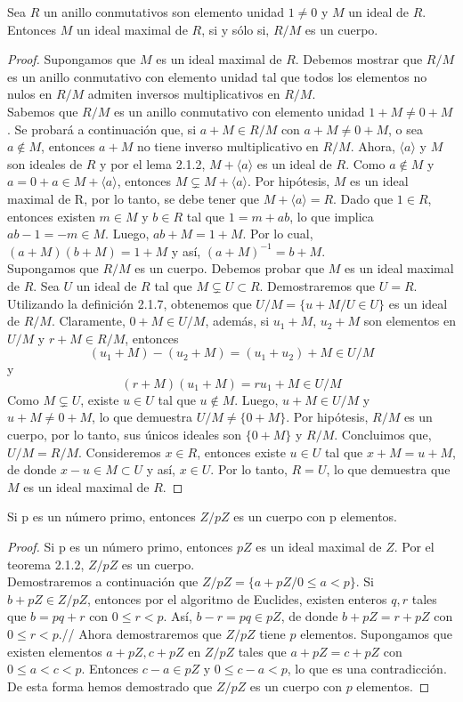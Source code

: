 \begin{teo}
Sea $R$ un anillo conmutativos son elemento unidad $1\neq 0$ y $M$ un ideal de $R$. Entonces $M$ un ideal maximal de $R$, si y sólo si, $R/M$ es un cuerpo.
\begin{proof}
Supongamos que $M$ es un ideal maximal de $R$. Debemos mostrar que $R/M$ es un anillo conmutativo con elemento unidad tal que todos los elementos no nulos en $R/M$  admiten inversos multiplicativos en $R/M$.\\
Sabemos que $R/M$ es un anillo conmutativo con elemento unidad $1+M\neq 0+M$. Se probará a continuación que, si $a+M\in R/M$ con $a+M\neq 0+M$, o sea $a\notin M$, entonces $a+M$ no tiene inverso multiplicativo en $R/M$. Ahora, $\langle a \rangle$ y $M$ son ideales de $R$ y por el lema 2.1.2, $M+\langle a \rangle$ es un ideal de $R$.
Como $a\notin M$ y $a=0+a\in M+\langle a \rangle$, entonces $M\subsetneq M+\langle a \rangle$. Por hipótesis, $M$ es un ideal maximal de R, por lo tanto, se debe tener que $M+\langle a \rangle = R$. Dado que $1\in R$, entonces existen $m\in M$ y $b\in R$ tal que $1=m+ab$, lo que implica $ab-1=-m\in M$. Luego, $ab+M=1+M$. Por lo cual, $(a+M)(b+M)=1+M$ y así, $(a+M)^{-1}=b+M$.\\
Supongamos que $R/M$ es un cuerpo. Debemos probar que $M$ es un ideal maximal de $R$. Sea $U$ un ideal de $R$ tal que $M \subsetneq U \subset R$. Demostraremos que $U=R$. Utilizando la definición 2.1.7, obtenemos que $U/M=\lbrace u+M/U\in U\rbrace$ es un ideal de $R/M$.
Claramente, $0+M\in U/M$, además, si $u_{1}+M$, $u_{2}+M$ son elementos en $U/M$ y $r+M\in R/M$, entonces
\[(u_{1}+M)-(u_{2}+M)=(u_{1}+u_{2})+M\in U/M\]
y
\[(r+M)(u_{1}+M)=ru_{1}+M\in U/M\]
Como $M\subsetneq U$, existe $u\in U$ tal que $u\notin M$. Luego, $u+M\in U/M$ y $u+M\neq 0+M$, lo que demuestra $U/M\neq \lbrace 0+M \rbrace$. Por hipótesis, $R/M$ es un cuerpo, por lo tanto, sus únicos ideales son $\lbrace 0+M \rbrace$ y $R/M$. Concluimos que, $U/M=R/M$. Consideremos $x\in R$, entonces existe $u\in U$ tal que $x+M=u+M$, de donde $x-u\in M\subset U$ y así, $x\in U$. Por lo tanto, $R=U$, lo que demuestra que $M$ es un ideal maximal de $R$.
\end{proof}
\end{teo}
\begin{lema}
Si p es un número primo, entonces $Z/pZ$ es un cuerpo con p elementos.
\begin{proof}
Si p es un número primo, entonces $pZ$ es un ideal maximal de $Z$. Por el teorema 2.1.2, $Z/pZ$ es un cuerpo.\\
Demostraremos a continuación que $Z/pZ = \lbrace a+pZ / 0\leq a < p \rbrace$. Si $b+pZ\in Z/pZ$, entonces por el algoritmo de Euclides, existen enteros $q,r$ tales que $b=pq+r$ con $0\leq r <p$. Así, $b-r=pq\in pZ$, de donde $b+pZ = r+pZ$ con $0\leq r < p$.//
Ahora demostraremos que $Z/pZ$ tiene $p$ elementos. Supongamos que existen elementos $a+pZ, c+pZ$ en $Z/pZ$ tales que $a+pZ = c+pZ$ con $0\leq a < c < p$. Entonces $c-a\in pZ$ y $0\leq c-a < p$, lo que es una contradicción. De esta forma hemos demostrado que $Z/pZ$ es un cuerpo con $p$ elementos.
\end{proof}
\end{lema}